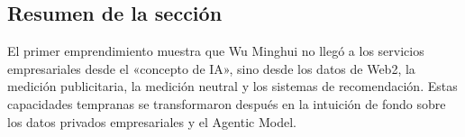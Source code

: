 \subsection{Resumen de la sección}

El primer emprendimiento muestra que Wu Minghui no llegó a los servicios empresariales desde el «concepto de IA», sino desde los datos de Web2, la medición publicitaria, la medición neutral y los sistemas de recomendación. Estas capacidades tempranas se transformaron después en la intuición de fondo sobre los datos privados empresariales y el Agentic Model.
